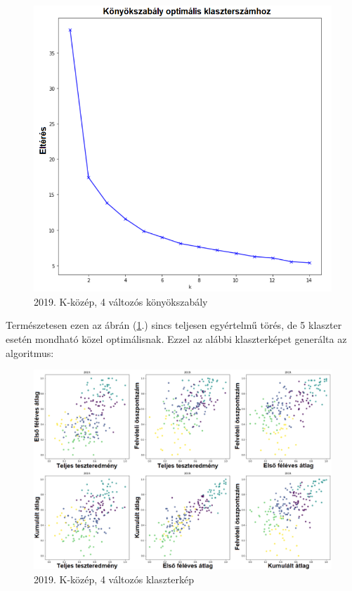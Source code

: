 \documentclass[12pt]{article}
\begin{document}
\begin{figure}[H]
\centering
\includegraphics[scale = 0.6]{kepek/2019_kmeans_best_konyok.png}
\caption{2019. K-közép, 4 változós könyökszabály}
\label{fig:2019_kmeans_best_konyok}
\end{figure}

Természetesen ezen az ábrán (\ref{fig:2019_kmeans_best_konyok}.) sincs teljesen egyértelmű törés, de 5 klaszter esetén mondható közel optimálisnak. Ezzel az alábbi klaszterképet generálta az algoritmus:

\begin{figure}[H]
\centering
\includegraphics[width = \textwidth]{kepek/2019_kmeans_5.png}
\caption{2019. K-közép, 4 változós klaszterkép}
\label{fig:2019_kmeans_5}
\end{figure}
\end{document}
